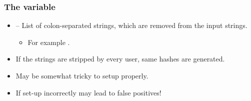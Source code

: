 \documentclass[compress,table,xcolor=table]{beamer}
\begin{document}
\begin{frame}
  \frametitle{The  variable}
  \Large
  \begin{itemize}
  \item {} -- List of colon-separated strings, which
      are removed from the input strings.
  \begin{itemize}
  \item For example .
  \end{itemize}
  \item If the  strings are stripped by every user, same hashes are
      generated.
  \item {\larger May be somewhat tricky to setup properly.}
  \item {\larger If set-up incorrectly may lead to false positives!}
  \end{itemize}
\end{frame}
\end{document}
